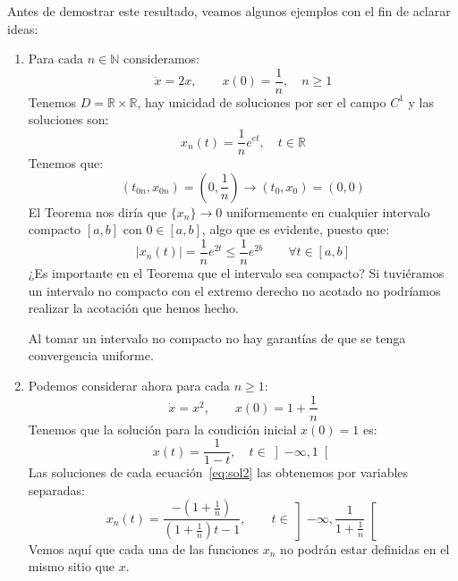 \begin{ejemplo}
Antes de demostrar este resultado, veamos algunos ejemplos con el fin de aclarar ideas:
\begin{enumerate}
    \item Para cada $n\in \mathbb{N}$ consideramos:
        \begin{equation*}
            \dot{x} = 2x, \qquad x(0) = \frac{1}{n}, \quad n\geq 1
        \end{equation*}
        Tenemos $D=\mathbb{R}\times \mathbb{R}$, hay unicidad de soluciones por ser el campo $C^1$ y las soluciones son:
        \begin{equation*}
            x_n(t) = \frac{1}{n}e^{et}, \quad t\in \mathbb{R}
        \end{equation*}
        Tenemos que:
        \begin{equation*}
            (t_{0n},x_{0n}) = \left(0, \frac{1}{n}\right) \to (t_0,x_0) = (0,0)
        \end{equation*}
        El Teorema nos diría que $\{x_n\}\to 0$ uniformemente en cualquier intervalo compacto $[a,b]$ con $0\in [a,b]$, algo que es evidente, puesto que:
        \begin{equation*}
            |x_n(t)| = \frac{1}{n}e^{2t} \leq \frac{1}{n}e^{2b} \qquad \forall t\in [a,b]
        \end{equation*}
        ¿Es importante en el Teorema que el intervalo sea compacto? Si tuviéramos un intervalo no compacto con el extremo derecho no acotado no podríamos realizar la acotación que hemos hecho.

        Al tomar un intervalo no compacto no hay garantías de que se tenga convergencia uniforme.
    \item Podemos considerar ahora para cada $n\geq 1$:
        \begin{equation}\label{eq:sol2}
            \dot{x} = x^2, \qquad x(0) = 1+\frac{1}{n}
        \end{equation}
        Tenemos que la solución para la condición inicial $x(0)=1$ es:
        \begin{equation*}
            x(t) = \frac{1}{1-t}, \quad t\in \left]-\infty,1\right[
        \end{equation*}
        Las soluciones de cada ecuación~\eqref{eq:sol2} las obtenemos por variables separadas:
        \begin{equation*}
            x_n(t) = \frac{-\left(1+\frac{1}{n}\right)}{\left(1+\frac{1}{n}\right)t-1}, \qquad t\in \left]-\infty,\frac{1}{1+\frac{1}{n}}\right[
        \end{equation*}
        Vemos aquí que cada una de las funciones $x_n$ no podrán estar definidas en el mismo sitio que $x$.
\end{enumerate}
\end{ejemplo}

